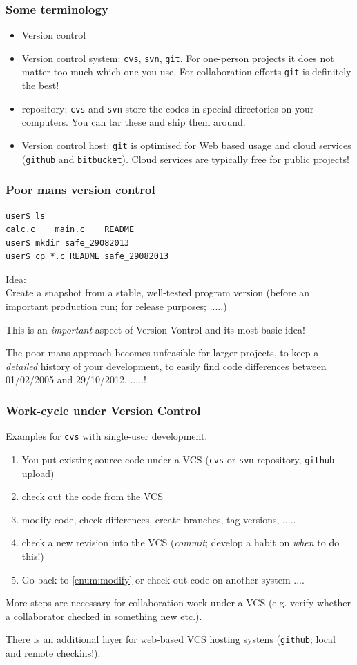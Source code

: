\documentclass{beamer}
\newcommand{\git}{\texttt{git}\xspace}
\newcommand{\svn}{\texttt{svn}\xspace}
\newcommand{\cvs}{\texttt{cvs}\xspace}
\newcommand{\github}{\texttt{github}\xspace}
\newcommand{\bitbucket}{\texttt{bitbucket}\xspace}
\begin{document}
%
\begin{frame}
\frametitle{Some terminology}
\small
\begin{itemize}
\item Version control
\item Version control system: \cvs, \svn, \git. For one-person projects it
  does not matter too much which one you use. For collaboration
  efforts \git is definitely the best!
\item repository: \cvs and \svn store the codes in special directories
  on your computers. You can tar these and ship them around.
\item Version control host: \git is optimised for Web based usage and
  cloud services (\github and \bitbucket). Cloud services are
  typically free for public projects!
\end{itemize}
\end{frame}
%
\begin{frame}[fragile]
\frametitle{Poor mans version control}
\small
\begin{verbatim}
user$ ls
calc.c    main.c    README
user$ mkdir safe_29082013
user$ cp *.c README safe_29082013
\end{verbatim}

\alert{Idea:} \\
Create a snapshot from a stable, well-tested program version
(before an important production run; for release purposes; .....)

\vspace{0.2cm}
This is an \emph{important} aspect of Version Vontrol and its most
basic idea!

\vspace{0.2cm}
The poor mans approach becomes unfeasible for larger projects, to
keep a \emph{detailed} history of your development, to easily find
code differences between 01/02/2005 and 29/10/2012, .....!
\end{frame}
%
\begin{frame}[fragile]
\frametitle{Work-cycle under Version Control}
Examples for \cvs with single-user development.
%
\begin{enumerate}
\item You put existing source code under a VCS (\cvs or \svn
  repository, \github upload)
\item check out the code from the VCS
\item \label{enum:modify} modify code, check differences, create
  branches, tag versions, .....
\item check a new revision into the VCS (\textit{commit}; develop a habit on
  \emph{when} to do this!)
\item Go back to \ref{enum:modify} or check out code on another system ....
\end{enumerate}
More steps are necessary for collaboration work under a VCS (e.g.
verify whether a collaborator checked in something new etc.).

There is an additional layer for web-based VCS hosting systens
(\github; local and remote checkins!).
\end{frame}
\end{document}
